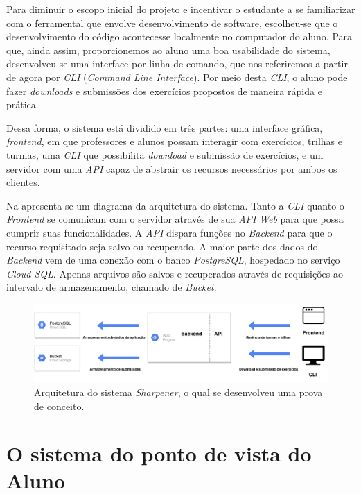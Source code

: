 Para diminuir o escopo inicial do projeto e incentivar o estudante a se familiarizar com o ferramental 
que envolve desenvolvimento de software, escolheu-se que o desenvolvimento do código 
acontecesse localmente no computador do aluno. Para que, ainda assim, proporcionemos ao aluno 
uma boa usabilidade do sistema, desenvolveu-se uma interface por linha de comando, que nos referiremos a partir de agora 
por \emph{CLI} (\emph{Command Line Interface}). Por meio desta \emph{CLI},
o aluno pode fazer \emph{downloads} e submissões
dos exercícios propostos de maneira rápida e prática.

Dessa forma, o sistema está dividido em três partes: uma interface gráfica, \emph{frontend}, 
em que professores e alunos possam interagir com exercícios, trilhas e turmas, uma \emph{CLI} que possibilita 
\emph{download} e submissão de exercícios, e um servidor com uma \emph{API} capaz de abstrair 
os recursos necessários por ambos os clientes. 

Na  apresenta-se um diagrama 
da arquitetura do sistema. Tanto a \emph{CLI} quanto o \emph{Frontend} se comunicam com o servidor através de sua \emph{API} \emph{Web} para que possa cumprir suas funcionalidades. A \emph{API} dispara funções no \emph{Backend} para que o recurso requisitado seja salvo ou recuperado. A maior parte dos dados do \emph{Backend} vem de uma conexão com o banco \emph{PostgreSQL}, hospedado no serviço \emph{Cloud SQL}. Apenas arquivos são salvos e recuperados através de requisições ao intervalo de armazenamento, chamado de \emph{Bucket}. 

  \begin{figure}[htpb]
    \centering
    \includegraphics[width=\linewidth]{images/arquitetura.pdf}
    \caption{Arquitetura do sistema \emph{Sharpener}, o qual 
    se desenvolveu uma prova de conceito.}%
    \label{fig:arquitetura}
  \end{figure}


\section{O sistema do ponto de vista do Aluno}
\label{ssec:aluno}

